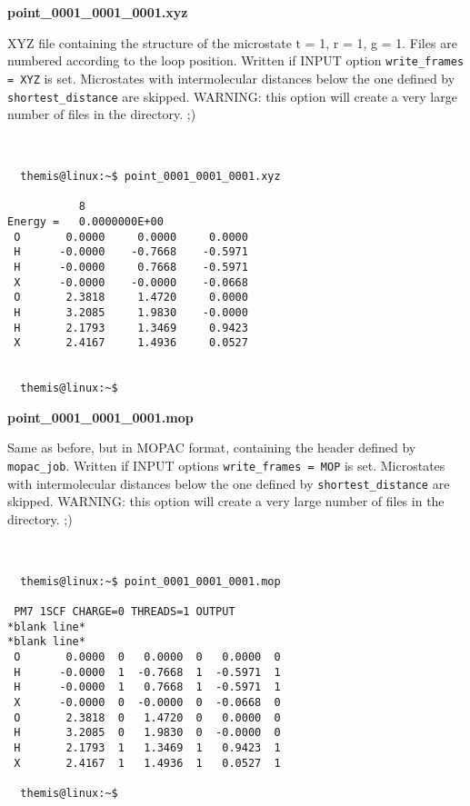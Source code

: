 \documentclass{achemso}
\begin{document}
\textbf{point\_0001\_0001\_0001.xyz}

  XYZ file containing the structure of the microstate t = 1, r = 1, g = 1. Files
are numbered according to the loop position. Written if INPUT option
\texttt{write\_frames = XYZ} is set. Microstates with intermolecular distances 
below the one defined by \texttt{shortest\_distance} are skipped. WARNING: this 
option will create a very large number of files in the directory. ;) \\~ 

\begin{center}
  \begin{minipage}{0.4\textwidth}
    \begin{verbatim}

  themis@linux:~$ point_0001_0001_0001.xyz

           8
Energy =   0.0000000E+00
 O       0.0000     0.0000     0.0000
 H      -0.0000    -0.7668    -0.5971
 H      -0.0000     0.7668    -0.5971
 X      -0.0000    -0.0000    -0.0668
 O       2.3818     1.4720     0.0000
 H       3.2085     1.9830    -0.0000
 H       2.1793     1.3469     0.9423
 X       2.4167     1.4936     0.0527


  themis@linux:~$ 

    \end{verbatim}
    \vskip0.25cm
  \end{minipage}%
\end{center}

\textbf{point\_0001\_0001\_0001.mop}
  
  Same as before, but in MOPAC format, containing the header defined by 
\texttt{mopac\_job}. Written if INPUT options \texttt{write\_frames = MOP} is 
set. Microstates with intermolecular distances below the one defined by 
\texttt{shortest\_distance} are skipped. WARNING: this option will create a 
very large number of files in the directory. ;) \\~ 

\begin{center}
  \begin{minipage}{0.4\textwidth}
    \begin{verbatim}

  themis@linux:~$ point_0001_0001_0001.mop

 PM7 1SCF CHARGE=0 THREADS=1 OUTPUT
*blank line*
*blank line*
 O       0.0000  0   0.0000  0   0.0000  0
 H      -0.0000  1  -0.7668  1  -0.5971  1
 H      -0.0000  1   0.7668  1  -0.5971  1
 X      -0.0000  0  -0.0000  0  -0.0668  0
 O       2.3818  0   1.4720  0   0.0000  0
 H       3.2085  0   1.9830  0  -0.0000  0 
 H       2.1793  1   1.3469  1   0.9423  1
 X       2.4167  1   1.4936  1   0.0527  1

  themis@linux:~$ 

    \end{verbatim}
    \vskip0.25cm
  \end{minipage}%
\end{center}
\end{document}
